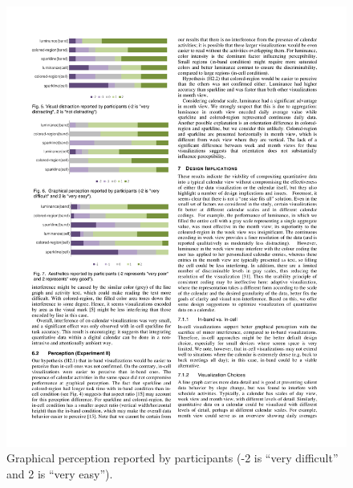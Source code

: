 \documentclass[12pt,oneside]{book}
\begin{document}
\begin{figure}
\centering
\includegraphics[width=\columnwidth]{figures/rating_perception}
\caption{ Graphical perception reported by participants (-2 is ``very difficult'' and 2 is ``very easy'').}
\label{fig:rating_perception}
\end{figure}
\end{document}
